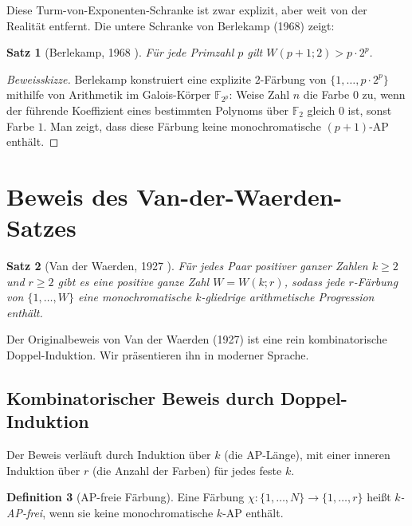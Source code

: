 \documentclass[12pt,a4paper]{amsart}
\newtheorem{theorem}{Satz}[section]
\theoremstyle{definition}
\newtheorem{definition}[theorem]{Definition}
\begin{document}
Diese Turm-von-Exponenten-Schranke ist zwar explizit, aber weit von der Realität
entfernt. Die untere Schranke von Berlekamp (1968) zeigt:

\begin{theorem}[Berlekamp, 1968 \cite{Berlekamp1968}]
Für jede Primzahl $p$ gilt $W(p+1; 2) > p \cdot 2^p$.
\end{theorem}

\begin{proof}[Beweisskizze]
Berlekamp konstruiert eine explizite $2$-Färbung von $\{1, \ldots, p \cdot 2^p\}$
mithilfe von Arithmetik im Galois-Körper $\mathbb{F}_{2^p}$: Weise Zahl $n$ die
Farbe $0$ zu, wenn der führende Koeffizient eines bestimmten Polynoms über $\mathbb{F}_2$
gleich $0$ ist, sonst Farbe $1$. Man zeigt, dass diese Färbung keine monochromatische
$(p+1)$-AP enthält.
\end{proof}

\section{Beweis des Van-der-Waerden-Satzes}\label{sec:beweis-vdw}

\begin{theorem}[Van der Waerden, 1927 \cite{VdW1927}]\label{satz:vdw}
Für jedes Paar positiver ganzer Zahlen $k \geq 2$ und $r \geq 2$ gibt es eine
positive ganze Zahl $W = W(k; r)$, sodass jede $r$-Färbung von $\{1, \ldots, W\}$
eine monochromatische $k$-gliedrige arithmetische Progression enthält.
\end{theorem}

Der Originalbeweis von Van der Waerden (1927) ist eine rein kombinatorische
Doppel-Induktion. Wir präsentieren ihn in moderner Sprache.

\subsection{Kombinatorischer Beweis durch Doppel-Induktion}

Der Beweis verläuft durch Induktion über $k$ (die AP-Länge), mit einer inneren
Induktion über $r$ (die Anzahl der Farben) für jedes feste $k$.

\begin{definition}[AP-freie Färbung]
Eine Färbung $\chi: \{1,\ldots,N\} \to \{1,\ldots,r\}$ heißt \emph{$k$-AP-frei},
wenn sie keine monochromatische $k$-AP enthält.
\end{definition}
\end{document}

